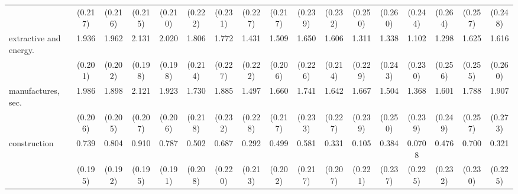 {\begin{tabular}{l*{16}{c}}
                    &     (0.217)         &     (0.216)         &     (0.215)         &     (0.210)         &     (0.222)         &     (0.231)         &     (0.227)         &     (0.217)         &     (0.239)         &     (0.232)         &     (0.250)         &     (0.260)         &     (0.244)         &     (0.264)         &     (0.257)         &     (0.248)         \\
[1em]
extractive and energy.&       1.936\sym{***}&       1.962\sym{***}&       2.131\sym{***}&       2.020\sym{***}&       1.806\sym{***}&       1.772\sym{***}&       1.431\sym{***}&       1.509\sym{***}&       1.650\sym{***}&       1.606\sym{***}&       1.311\sym{***}&       1.338\sym{***}&       1.102\sym{***}&       1.298\sym{***}&       1.625\sym{***}&       1.616\sym{***}\\
                    &     (0.201)         &     (0.202)         &     (0.198)         &     (0.198)         &     (0.214)         &     (0.227)         &     (0.222)         &     (0.206)         &     (0.226)         &     (0.214)         &     (0.229)         &     (0.243)         &     (0.230)         &     (0.256)         &     (0.255)         &     (0.260)         \\
[1em]
manufactures, sec.  &       1.986\sym{***}&       1.898\sym{***}&       2.121\sym{***}&       1.923\sym{***}&       1.730\sym{***}&       1.885\sym{***}&       1.497\sym{***}&       1.660\sym{***}&       1.741\sym{***}&       1.642\sym{***}&       1.667\sym{***}&       1.504\sym{***}&       1.368\sym{***}&       1.601\sym{***}&       1.788\sym{***}&       1.907\sym{***}\\
                    &     (0.206)         &     (0.205)         &     (0.207)         &     (0.206)         &     (0.218)         &     (0.232)         &     (0.228)         &     (0.217)         &     (0.233)         &     (0.227)         &     (0.239)         &     (0.250)         &     (0.239)         &     (0.249)         &     (0.257)         &     (0.273)         \\
[1em]
construction        &       0.739\sym{***}&       0.804\sym{***}&       0.910\sym{***}&       0.787\sym{***}&       0.502\sym{*}  &       0.687\sym{**} &       0.292         &       0.499\sym{*}  &       0.581\sym{**} &       0.331         &       0.105         &       0.384         &      0.0708         &       0.476\sym{*}  &       0.700\sym{**} &       0.321         \\
                    &     (0.195)         &     (0.192)         &     (0.195)         &     (0.191)         &     (0.208)         &     (0.220)         &     (0.213)         &     (0.202)         &     (0.217)         &     (0.207)         &     (0.221)         &     (0.237)         &     (0.225)         &     (0.232)         &     (0.230)         &     (0.225)         \\

\end{tabular}}
